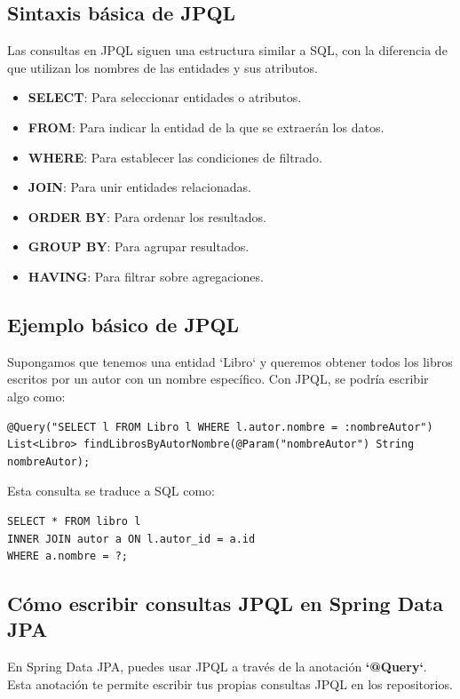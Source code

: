 \documentclass[11pt]{article}
\begin{document}
\subsection{Sintaxis básica de JPQL}
\label{sec:orgb9e3ff7}
Las consultas en JPQL siguen una estructura similar a SQL, con la diferencia de que utilizan los nombres de las entidades y sus atributos.

\begin{itemize}
\item \textbf{\textbf{SELECT}}: Para seleccionar entidades o atributos.
\item \textbf{\textbf{FROM}}: Para indicar la entidad de la que se extraerán los datos.
\item \textbf{\textbf{WHERE}}: Para establecer las condiciones de filtrado.
\item \textbf{\textbf{JOIN}}: Para unir entidades relacionadas.
\item \textbf{\textbf{ORDER BY}}: Para ordenar los resultados.
\item \textbf{\textbf{GROUP BY}}: Para agrupar resultados.
\item \textbf{\textbf{HAVING}}: Para filtrar sobre agregaciones.
\end{itemize}

\subsection{Ejemplo básico de JPQL}
\label{sec:org056dd68}
Supongamos que tenemos una entidad `Libro` y queremos obtener todos los libros escritos por un autor con un nombre específico. Con JPQL, se podría escribir algo como:

\begin{verbatim}
@Query("SELECT l FROM Libro l WHERE l.autor.nombre = :nombreAutor")
List<Libro> findLibrosByAutorNombre(@Param("nombreAutor") String nombreAutor);
\end{verbatim}

Esta consulta se traduce a SQL como:

\begin{verbatim}
SELECT * FROM libro l
INNER JOIN autor a ON l.autor_id = a.id
WHERE a.nombre = ?;
\end{verbatim}

\subsection{Cómo escribir consultas JPQL en Spring Data JPA}
\label{sec:orge297767}
En Spring Data JPA, puedes usar JPQL a través de la anotación \textbf{\textbf{`@Query`}}. Esta anotación te permite escribir tus propias consultas JPQL en los repositorios.
\end{document}
